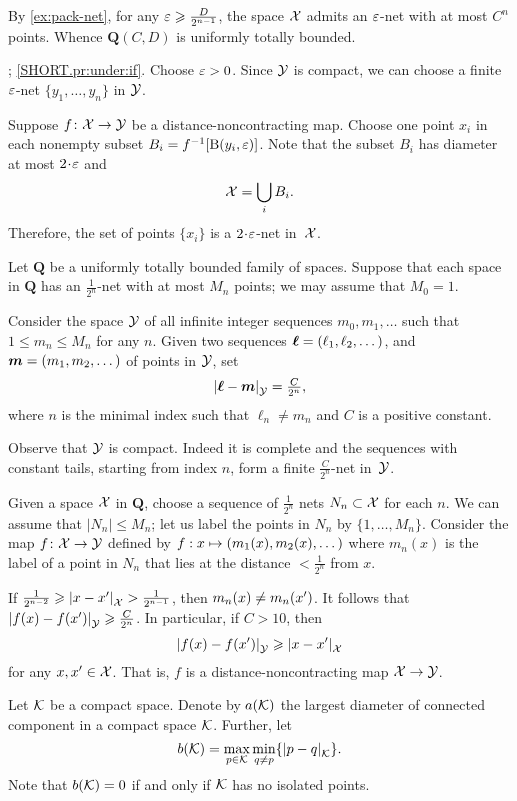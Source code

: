 By \ref{ex:pack-net}, for any $\varepsilon\geqslant\frac D{2^{n-1}}$, the space $\mathcal{X}$ admits an $\varepsilon$-net with at most $C^n$ points.
Whence $\bm{Q}(C,D)$ is uniformly totally bounded.

\parbf{\ref{pr:under}}; \ref{SHORT.pr:under:if}.
Choose $\varepsilon>0$.
Since $\mathcal{Y}$ is compact, we can choose a finite $\varepsilon$-net $\{y_1,\dots,y_{n}\}$ in $\mathcal{Y}$.

Suppose $f\colon\mathcal{X}\to \mathcal{Y}$ be a distance-noncontracting map.
Choose one point $x_i$ in each nonempty subset $B_i=f^{-1}[\mathrm{B}{}(y_i,\varepsilon)]$.
Note that the subset $B_i$ has diameter at most $2\cdot \eps$ and 
\[\mathcal{X}=\bigcup_iB_i.\]
Therefore, the set of points $\{x_i\}$ is a $2\cdot\eps$-net in~$\mathcal{X}$.

Let $\bm{Q}$ be a uniformly totally bounded family of spaces. 
Suppose that each space in $\bm{Q}$ has an $\tfrac1{2^n}$-net with at most $M_n$ points; we may assume that $M_0=1$.

Consider the space $\mathcal{Y}$ of all infinite integer sequences $m_0,m_1,\dots$ such that $1\le m_n\le M_n$ for any $n$.
Given two sequences $\bm{\ell}\z=(\ell_1,\ell_2,\dots)$, and $\bm{m}\z=(m_1,m_2,\dots)$ of points in $\mathcal{Y}$, set 
\[\dist{\bm{\ell}}{\bm{m}}{\spc{Y}}=\tfrac C{2^{n}},\]
where $n$ is the minimal index such that $\ell_n\ne m_n$ and $C$ is a positive constant.

Observe that $\mathcal{Y}$ is compact.
Indeed it is complete and the sequences with constant tails, starting from index $n$, form a finite $\tfrac C{2^{n}}$-net in~$\mathcal{Y}$.

Given a space $\mathcal{X}$ in $\bm{Q}$,
choose a sequence of $\tfrac1{2^n}$ nets 
$N_n\subset\mathcal{X}$ for each $n$.
We can assume that $|N_n|\le M_n$; let us label the points in $N_n$ by $\{1,\dots,M_n\}$.
Consider the map $f\colon\mathcal{X}\to\mathcal{Y}$ defined by $f:x\z\mapsto (m_1(x),m_2(x),\dots)$ where $m_n(x)$ is the label of a point in $N_n$ that lies at the distance $<\tfrac1{2^n}$ from $x$.

If $\tfrac1{2^{n-2}}\ge \dist{x}{x'}{\spc{X}}>\tfrac1{2^{n-1}}$, then $m_n(x)\z\ne m_n(x')$.
It follows that $\dist{f(x)}{f(x')}{\spc{Y}}\ge \tfrac C{2^{n}}$.
In particular, if $C>10$, then 
\[\dist{f(x)}{f(x')}{\spc{Y}}\ge \dist{x}{x'}{\spc{X}}\]
for any $x,x'\in \mathcal{X}$.
That is, $f$ is a distance-noncontracting map $\mathcal{X}\to \mathcal{Y}$.

Let $\mathcal{K}$ be a compact space.
Denote by $a(\mathcal{K})$ the largest diameter of connected component in a compact space $\mathcal{K}$.
Further, let 
\[b(\spc{K})=\max_{p\in \spc{K}}\min_{q\ne p}\{\dist{p}{q}{\spc{K}}\}.\]
Note that $b(\mathcal{K})=0$ if and only if $\mathcal{K}$ has no isolated points.

